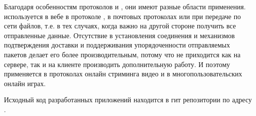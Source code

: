 Благодаря особенностям протоколов  и , они имеют разные области применения.  используется в вебе в протоколе , в почтовых протоколах или при передаче по сети файлов, т.е. в тех случаях, когда важно на другой стороне получить все отправленные данные. Отсутствие в  установления соединения и механизмов подтверждения доставки и поддерживания упорядоченности отправляемых пакетов делает его более производительным, потому что не приходится как на сервере, так и на клиенте производить дополнительную работу. И поэтому  применяется в протоколах онлайн стриминга видео и в многопользовательских онлайн играх.

Исходный код разработанных приложений находится в гит репозитории по адресу \href{https://github.com/lamtev/nets}{}.



